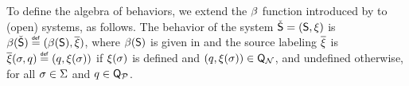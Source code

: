 To define the algebra of behaviors, we extend the $\beta$ function
introduced by  to (open) systems, as follows. The
behavior of the system $\check{\mathsf{S}}=(\mathsf{S},\xi)$ is
$\beta({\check{\mathsf{S}}})\stackrel{\scriptscriptstyle{\mathsf{def}}}{=}(\beta({\mathsf{S}}),\overline{\xi})$, where
$\beta({\mathsf{S}})$ is given in  and the source
labeling $\overline{\xi}$ is $\overline{\xi}(\sigma,q) \stackrel{\scriptscriptstyle{\mathsf{def}}}{=}
(q,\xi(\sigma))$ if $\xi(\sigma)$ is defined and
$(q,\xi(\sigma)) \in \mathsf{Q}_{\mathcal{N}}$, and undefined
otherwise, for all $\sigma\in\Sigma$ and $q \in
\mathsf{Q}_{\mathcal{P}}$.

